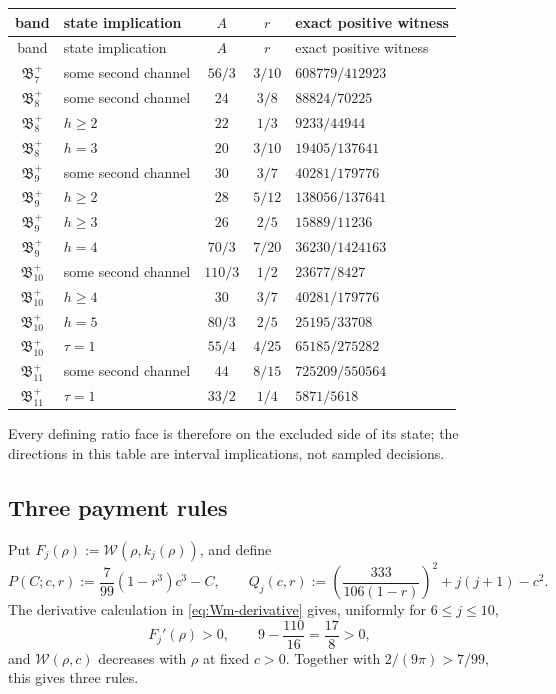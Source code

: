 \documentclass[11pt]{article}
\newcommand{\W}{\mathcal W}
\begin{document}
\begingroup
\small
\renewcommand{\arraystretch}{1.14}
\begin{longtable}{@{}c L{5.0cm} c c L{3.5cm}@{}}
\toprule
band&state implication&\(A\)&\(r\)&exact positive witness\\
\midrule
\endfirsthead
\toprule
band&state implication&\(A\)&\(r\)&exact positive witness\\
\midrule
\endhead
\(\mathfrak B_7^+\)&some second channel&\(56/3\)&\(3/10\)&\(608779/412923\)\\
\(\mathfrak B_8^+\)&some second channel&\(24\)&\(3/8\)&\(88824/70225\)\\
\(\mathfrak B_8^+\)&\(h\geq2\)&\(22\)&\(1/3\)&\(9233/44944\)\\
\(\mathfrak B_8^+\)&\(h=3\)&\(20\)&\(3/10\)&\(19405/137641\)\\
\(\mathfrak B_9^+\)&some second channel&\(30\)&\(3/7\)&\(40281/179776\)\\
\(\mathfrak B_9^+\)&\(h\geq2\)&\(28\)&\(5/12\)&\(138056/137641\)\\
\(\mathfrak B_9^+\)&\(h\geq3\)&\(26\)&\(2/5\)&\(15889/11236\)\\
\(\mathfrak B_9^+\)&\(h=4\)&\(70/3\)&\(7/20\)&\(36230/1424163\)\\
\(\mathfrak B_{10}^+\)&some second channel&\(110/3\)&\(1/2\)&\(23677/8427\)\\
\(\mathfrak B_{10}^+\)&\(h\geq4\)&\(30\)&\(3/7\)&\(40281/179776\)\\
\(\mathfrak B_{10}^+\)&\(h=5\)&\(80/3\)&\(2/5\)&\(25195/33708\)\\
\(\mathfrak B_{10}^+\)&\(\tau=1\)&\(55/4\)&\(4/25\)&\(65185/275282\)\\
\(\mathfrak B_{11}^+\)&some second channel&\(44\)&\(8/15\)&\(725209/550564\)\\
\(\mathfrak B_{11}^+\)&\(\tau=1\)&\(33/2\)&\(1/4\)&\(5871/5618\)\\
\bottomrule
\end{longtable}
\endgroup
Every defining ratio face is therefore on the excluded side of its state;
the directions in this table are interval implications, not sampled
decisions.

\subsection{Three payment rules}

Put \(F_j(\rho):=\W(\rho,k_j(\rho))\), and define
\begin{equation}
 P(C;c,r):=\frac7{99}(1-r^3)c^3-C,
 \qquad
 Q_j(c,r):=
 \left(\frac{333}{106(1-r)}\right)^2+j(j+1)-c^2.
 \label{eq:PQ-def}
\end{equation}
The derivative calculation in \eqref{eq:Wm-derivative} gives, uniformly
for \(6\leq j\leq10\),
\[
 F_j'(\rho)>0,
 \qquad
 9-\frac{110}{16}=\frac{17}{8}>0,
\]
and \(\W(\rho,c)\) decreases with \(\rho\) at fixed \(c>0\).  Together
with \(2/(9\pi)>7/99\), this gives three rules.
\end{document}
